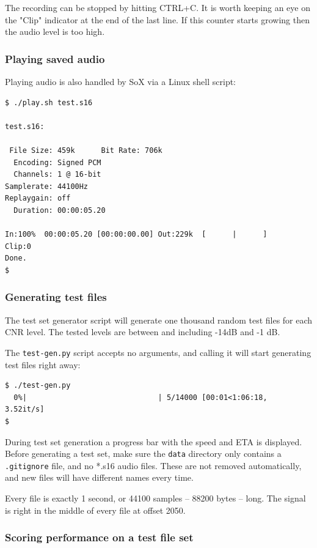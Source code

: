 \documentclass[a4paper]{article}
\begin{document}
The recording can be stopped by hitting CTRL+C. It is worth keeping an 
eye on the "Clip" indicator at the end of the last line. If this 
counter starts growing then the audio level is too high.

\subsubsection{Playing saved audio}

Playing audio is also handled by SoX via a Linux shell script:

\begin{lstlisting}
$ ./play.sh test.s16 

test.s16:

 File Size: 459k      Bit Rate: 706k
  Encoding: Signed PCM    
  Channels: 1 @ 16-bit   
Samplerate: 44100Hz      
Replaygain: off         
  Duration: 00:00:05.20  

In:100%  00:00:05.20 [00:00:00.00] Out:229k  [      |      ]     Clip:0    
Done.
$
\end{lstlisting}

\subsubsection{Generating test files}

The test set generator script will generate one thousand random test 
files for each CNR level. The tested levels are between and including
-14dB and -1 dB.

The \texttt{test-gen.py} script accepts no arguments, and calling it 
will start generating test files right away:

\begin{lstlisting}
$ ./test-gen.py 
  0%|                              | 5/14000 [00:01<1:06:18,  3.52it/s]
$
\end{lstlisting}

During test set generation a progress bar with the speed and ETA is 
displayed. Before generating a test set, make sure the \texttt{data} 
directory only contains a \texttt{.gitignore} file, and no *.s16 audio 
files. These are not removed automatically, and new files will have
different names every time.

Every file is exactly 1 second, or 44100 samples -- 88200 bytes -- 
long. The signal is right in the middle of every file at offset 2050.

\subsubsection{Scoring performance on a test file set}
\end{document}
